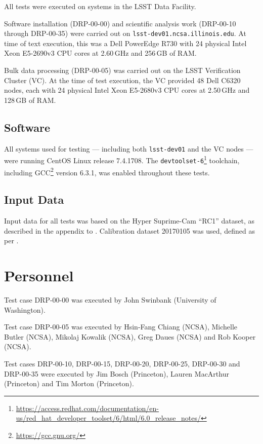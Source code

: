 \documentclass[DM,lsstdraft,STR,toc]{lsstdoc}
\begin{document}
All tests were executed on systems in the LSST Data Facility.

Software installation (DRP-00-00) and scientific analysis work (DRP-00-10 through DRP-00-35) were carried out on \texttt{lsst-dev01.ncsa.illinois.edu}.
At time of text execution, this was a Dell PowerEdge R730 with 24 physical Intel Xeon E5-2690v3 CPU cores at 2.60\,GHz and 256\,GB of RAM.

Bulk data processing (DRP-00-05) was carried out on the LSST Verification Cluster (VC).
At the time of test execution, the VC provided 48 Dell C6320 nodes, each with 24 physical Intel Xeon E5-2680v3 CPU cores at 2.50\,GHz and 128\,GB of RAM.

\subsection{Software}
\label{sect:swconf}

All systems used for testing --- including both \texttt{lsst-dev01} and the VC nodes --- were running CentOS Linux release 7.4.1708.
The \texttt{devtoolset-6}\footnote{\url{https://access.redhat.com/documentation/en-us/red_hat_developer_toolset/6/html/6.0_release_notes/}} toolchain, including GCC\footnote{\url{https://gcc.gnu.org/}} version 6.3.1, was enabled throughout these tests.

\subsection{Input Data}
\label{sect:inputdata}

Input data for all tests was based on the Hyper Suprime-Cam “RC1” dataset, as described in the appendix to .
Calibration dataset 20170105 was used, defined as per .

\section{Personnel}
\label{sect:personnel}

Test case DRP-00-00 was executed by John Swinbank (University of Washington).

Test case DRP-00-05 was executed by Hsin-Fang Chiang (NCSA), Michelle Butler (NCSA), Mikolaj Kowalik (NCSA), Greg Daues (NCSA) and Rob Kooper (NCSA).

Test cases DRP-00-10, DRP-00-15, DRP-00-20, DRP-00-25, DRP-00-30 and DRP-00-35 were executed by Jim Bosch (Princeton), Lauren MacArthur (Princeton) and Tim Morton (Princeton).
\end{document}
